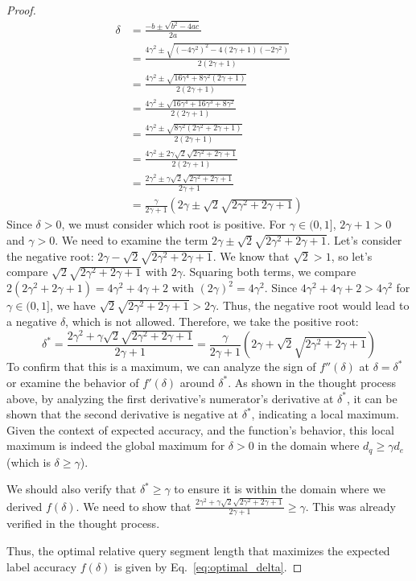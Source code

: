 \begin{proof}
\begin{align*}
    \delta &= \frac{-b \pm \sqrt{b^2 - 4ac}}{2a} \\
    &= \frac{4\gamma^2 \pm \sqrt{(-4\gamma^2)^2 - 4(2\gamma + 1)(-2\gamma^2)}}{2(2\gamma + 1)} \\
    &= \frac{4\gamma^2 \pm \sqrt{16\gamma^4 + 8\gamma^2(2\gamma + 1)}}{2(2\gamma + 1)} \\
    &= \frac{4\gamma^2 \pm \sqrt{16\gamma^4 + 16\gamma^3 + 8\gamma^2}}{2(2\gamma + 1)} \\
    &= \frac{4\gamma^2 \pm \sqrt{8\gamma^2(2\gamma^2 + 2\gamma + 1)}}{2(2\gamma + 1)} \\
    &= \frac{4\gamma^2 \pm 2\gamma\sqrt{2}\sqrt{2\gamma^2 + 2\gamma + 1}}{2(2\gamma + 1)} \\
    &= \frac{2\gamma^2 \pm \gamma\sqrt{2}\sqrt{2\gamma^2 + 2\gamma + 1}}{2\gamma + 1} \\
    &= \frac{\gamma}{2\gamma + 1} \left( 2\gamma \pm \sqrt{2}\sqrt{2\gamma^2 + 2\gamma + 1} \right)
\end{align*}
Since $\delta > 0$, we must consider which root is positive. For $\gamma \in (0, 1]$, $2\gamma + 1 > 0$ and $\gamma > 0$. We need to examine the term $2\gamma \pm \sqrt{2}\sqrt{2\gamma^2 + 2\gamma + 1}$. Let's consider the negative root:
$2\gamma - \sqrt{2}\sqrt{2\gamma^2 + 2\gamma + 1}$. We know that $\sqrt{2} > 1$, so let's compare $\sqrt{2}\sqrt{2\gamma^2 + 2\gamma + 1}$ with $2\gamma$. Squaring both terms, we compare $2(2\gamma^2 + 2\gamma + 1) = 4\gamma^2 + 4\gamma + 2$ with $(2\gamma)^2 = 4\gamma^2$. Since $4\gamma^2 + 4\gamma + 2 > 4\gamma^2$ for $\gamma \in (0, 1]$, we have $\sqrt{2}\sqrt{2\gamma^2 + 2\gamma + 1} > 2\gamma$. Thus, the negative root would lead to a negative $\delta$, which is not allowed. Therefore, we take the positive root:
\begin{equation}
    \delta^* = \frac{2\gamma^2 + \gamma\sqrt{2}\sqrt{2\gamma^2 + 2\gamma + 1}}{2\gamma + 1} = \frac{\gamma}{2\gamma + 1} \left( 2\gamma + \sqrt{2}\sqrt{2\gamma^2 + 2\gamma + 1} \right)
\end{equation}
To confirm that this is a maximum, we can analyze the sign of $f''(\delta)$ at $\delta = \delta^*$ or examine the behavior of $f'(\delta)$ around $\delta^*$. As shown in the thought process above, by analyzing the first derivative's numerator's derivative at $\delta^*$, it can be shown that the second derivative is negative at $\delta^*$, indicating a local maximum. Given the context of expected accuracy, and the function's behavior, this local maximum is indeed the global maximum for $\delta > 0$ in the domain where $d_q \geq \gamma d_e$ (which is $\delta \geq \gamma$).

We should also verify that $\delta^* \geq \gamma$ to ensure it is within the domain where we derived $f(\delta)$.  We need to show that $\frac{2\gamma^2 + \gamma\sqrt{2}\sqrt{2\gamma^2 + 2\gamma + 1}}{2\gamma + 1} \geq \gamma$. This was already verified in the thought process.

Thus, the optimal relative query segment length that maximizes the expected label accuracy $f(\delta)$ is given by Eq.~\ref{eq:optimal_delta}.
\end{proof}

